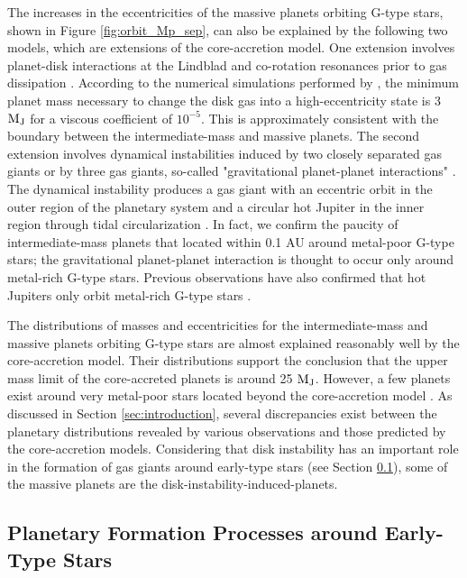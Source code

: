\documentclass[twocolumn]{aastex62}
\begin{document}
\begin{CJK*}{UTF8}{min}
The increases in the eccentricities of the massive planets orbiting G-type stars, shown in Figure \ref{fig:orbit_Mp_sep}, can also be explained by the following two models, which are extensions of the core-accretion model. One extension involves planet-disk interactions at the Lindblad and co-rotation resonances prior to gas dissipation \citep[e.g.,][]{2003ApJ...585.1024G}. According to the numerical simulations performed by \cite{2006A&A...447..369K}, the minimum planet mass necessary to change the disk gas into a high-eccentricity state is 3 $\rm M_J$ for a viscous coefficient of $10^{-5}$. This is approximately consistent with the boundary between the intermediate-mass and massive planets. The second extension involves dynamical instabilities induced by two closely separated gas giants or by three gas giants, so-called "gravitational planet-planet interactions" \citep[e.g.,][]{2013ApJ...775...42I}. The dynamical instability produces a gas giant with an eccentric orbit in the outer region of the planetary system and a circular hot Jupiter in the inner region through tidal circularization \citep[e.g.,][]{1996Sci...274..954R}. In fact, we confirm the paucity of intermediate-mass planets that located within 0.1 AU around metal-poor G-type stars; the gravitational planet-planet interaction is thought to occur only around metal-rich G-type stars. Previous observations have also confirmed that hot Jupiters only orbit metal-rich G-type stars \citep{2013ApJ...767L..24D, 2013A&A...560A..51A}.

The distributions of masses and eccentricities for the intermediate-mass and massive planets orbiting G-type stars are almost explained reasonably well by the core-accretion model. Their distributions support the conclusion that the upper mass limit of the core-accreted planets is around 25 $\rm M_J$. However, a few planets exist around very metal-poor stars located beyond the core-accretion model \citep{2012A&A...541A..97M}. As discussed in Section \ref{sec:introduction}, several discrepancies exist between the planetary distributions revealed by various observations and those predicted by the core-accretion models. Considering that disk instability has an important role in the formation of gas giants around early-type stars (see Section \ref{subsec:early}), some of the massive planets are the disk-instability-induced-planets.

\subsection{Planetary Formation Processes around Early-Type Stars} \label{subsec:early}


\end{CJK*}
\end{document}

